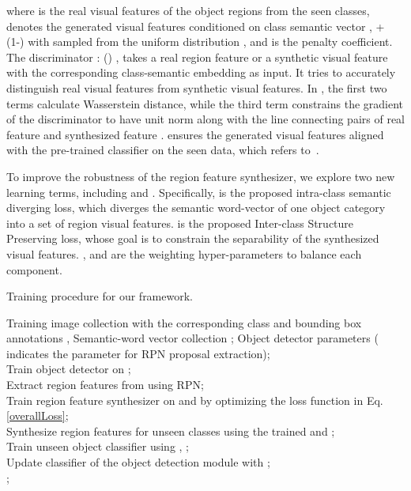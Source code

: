 \documentclass[10pt,twocolumn,letterpaper]{article}
\begin{document}
where  is the real visual features of the object regions from the seen classes,  denotes the generated visual features conditioned on class semantic vector ,  + (1-) with  sampled from the uniform distribution , and  is the penalty coefficient.
The discriminator :  ()    , takes a real region feature    or a synthetic visual feature  with the corresponding class-semantic embedding  as input. It tries to accurately distinguish real visual features from synthetic visual features. In ,
the first two terms calculate Wasserstein distance, while the third term constrains the gradient of the discriminator  to have unit norm along with the line connecting pairs of real feature  and synthesized feature .  ensures the generated visual features aligned with the pre-trained classifier on the seen data, which refers to~\cite{hayat2020synthesizing}.

To improve the robustness of the region feature synthesizer, we explore two new learning terms, including  and . Specifically,  is the proposed intra-class semantic diverging loss, which diverges the semantic word-vector of one object category into a set of region visual features.  is the proposed Inter-class Structure Preserving loss, whose goal is to constrain the separability of the synthesized visual features. ,  and  are the weighting hyper-parameters to balance each component. 

\begin{algorithm}[t]
  \renewcommand{\algorithmicrequire}{\textbf{Input:}}
  \renewcommand{\algorithmicensure}{\textbf{Output:}}
  \caption{Training procedure for our framework.}
  \begin{algorithmic}[1]
\Require
      Training image collection with the corresponding class and bounding box annotations , Semantic-word vector collection ;
    \Ensure
     Object detector parameters  ( indicates the parameter for RPN proposal extraction);\\
       Train object detector on ;\\
       Extract region features from  using RPN;\\
  Train region feature synthesizer on  and  by optimizing the loss function in Eq. \ref{overallLoss};\\
       Synthesize region features for unseen classes using the trained  and ;\\
       Train unseen object classifier  using , ;\\
       Update classifier  of the object detection module with ;\\
\Return  ;
    \label{implementation-process}
  \end{algorithmic}
\end{algorithm}
\end{document}
